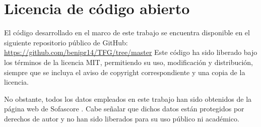 \section{Licencia de código abierto}
El código desarrollado en el marco de este trabajo se encuentra disponible en el siguiente repositorio público de GitHub: \url{https://github.com/benipr14/TFG/tree/master} Este código ha sido liberado bajo los términos de la licencia MIT, permitiendo su uso, modificación y distribución, siempre que se incluya el aviso de copyright correspondiente y una copia de la licencia.

No obstante, todos los datos empleados en este trabajo han sido obtenidos de la página web de Sofascore \cite{Sofascore}. Cabe señalar que dichos datos están protegidos por derechos de autor y no han sido liberados para su uso público ni académico.
